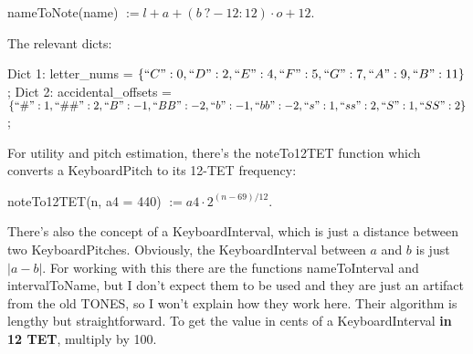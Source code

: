 \documentclass{article}
\begin{document}
nameToNote(name) $:=l + a + (b\: ? -12 : 12)\cdot o + 12.$

The relevant dicts:

Dict 1: letter\_nums = $\{ ``C": 0, ``D": 2, ``E": 4, ``F": 5, ``G": 7, ``A": 9, ``B": 11 \}$;
Dict 2: accidental\_offsets = $\{ ``\#": 1, ``\#\#": 2, ``B": -1, ``BB": -2, ``b": -1, ``bb": -2, ``s": 1, ``ss": 2, ``S": 1, ``SS": 2 \}$;

For utility and pitch estimation, there's the noteTo12TET function which converts a KeyboardPitch to its 12-TET frequency:

noteTo12TET(n, a4 = 440) $:= a4 \cdot 2^{(n - 69)/12}.$

There's also the concept of a KeyboardInterval, which is just a distance between two KeyboardPitches. Obviously, the KeyboardInterval between $a$ and $b$ is just $|a-b|$. For working with this there are the functions nameToInterval and intervalToName, but I don't expect them to be used and they are just an artifact from the old TONES, so I won't explain how they work here. Their algorithm is lengthy but straightforward. To get the value in cents of a KeyboardInterval \textbf{in 12 TET}, multiply by 100.
\end{document}
